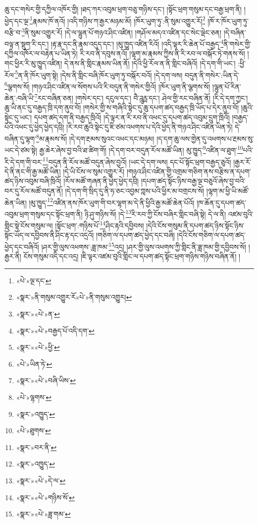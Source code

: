 ཆུ་དང་གསེར་གྱི་དཀྱིལ་འཁོར་གྱི། །ཐད་ཀར་འབུམ་ཕྲག་བཅུ་གཉིས་དང་། །སྟོང་ཕྲག་གསུམ་དང་བརྒྱ་ཕྲག་ནི། །ཕྱེད་དང་ལྔ་\footnote{«པེ་»ལྔ་དང་}རྣམས་ཁོ་ནའོ། །འདི་གཉིས་ཀ་རྒྱར་མཉམ་མོ། །ཁོར་ཡུག་ཏུ་:ནི་སུམ་འགྱུར་རོ།\footnote{«སྣར་»ནི་གསུམ་འགྱུར་རོ«པེ་»ནི་གསུམ་འགྱུར།} །ཁོ་ར་ཁོར་ཡུག་ཏུ་བརྩི་བ་\footnote{«སྣར་»«པེ་»ན་}ནི་སུམ་འགྱུར་རོ། །དེ་ལ་ལྷུན་པོ་གཉའ་ཤིང་འཛིན། །གཤོལ་མདའ་འཛིན་དང་སེང་ལྡེང་ཅན། །དེ་བཞིན་བལྟ་ན་སྡུག་རི་དང་། །རྟ་རྣ་དང་ནི་རྣམ་འདུད་དང་། །མུ་ཁྱུད་འཛིན་རིའོ། །འདི་ལྟར་རི་ཆེན་པོ་བརྒྱད་\footnote{«སྣར་»«པེ་»བརྒྱད་པོ་འདི་དག་}ནི་གསེར་གྱི་དཀྱིལ་འཁོར་ལ་བརྟེན་པ་ཡིན་ཏེ། རི་རབ་ནི་དབུས་ནའོ། །ལྷག་མ་རྣམས་ཀྱིས་ནི་རི་རབ་ལ་བསྐོར་ཏེ་གནས་སོ། །གང་ཕྱིར་རི་མུ་ཁྱུད་འཛིན། དེ་ནས་ནི་གླིང་རྣམས་ཡིན་ནོ། །དེའི་ཕྱི་རོལ་ན་ནི་གླིང་བཞིའོ། །དེ་དག་གི་ཡང་། :ཕྱི་རོལ་\footnote{«སྣར་»«པེ་»ཕྱི་}ན་ནི་ཁོར་ཡུག་སྟེ། །དེས་ནི་གླིང་བཞི་ཁོར་ཡུག་ཏུ་བསྐོར་བའོ། །དེ་དག་ལས། བདུན་ནི་གསེར་:ཡིན་དེ་\footnote{«པེ་»ཡིན་ཏེ་}ལྕགས་སོ། །གཉའ་ཤིང་འཛིན་ལ་སོགས་པའི་རི་བདུན་ནི་གསེར་གྱིའོ། །ཁོར་ཡུག་ནི་ལྕགས་སོ། །ལྷུན་པོ་རིན་ཆེན་:བཞི་ཡི་\footnote{«སྣར་»«པེ་»བཞི་ཡིས་}རང་བཞིན་ཅན། །གསེར་དང་། དངུལ་དང་། བཻ་ཌཱུཪྻ་དང་། ཤེལ་གྱི་རང་བཞིན་ནོ། །རི་དེ་དག་ཀྱང་། ཆུ་ཡི་ནང་དུ་བརྒྱད་ཁྲི་དག་ནུབ་བོ། །གསེར་གྱི་ས་གཞིའི་སྟེང་དུ་ཆུ་དཔག་ཚད་བརྒྱད་ཁྲི་ཡོད་པ་དེར་ནུབ་བོ། །ཆུའི་སྟེང་དུ་ཡང་། དཔག་ཚད་དག་ནི་བརྒྱད་ཁྲིའོ། །དེ་ལྟར་ན་རི་རབ་ནི་འཕང་དུ་དཔག་ཚད་འབུམ་དྲུག་ཁྲིའོ། །བརྒྱད་པོའི་འཕང་དུ་ཕྱེད་ཕྱེད་དབྲི། །རི་རབ་ཆུའི་སྟེང་དུ་ཇི་ཙམ་འཕགས་པ་དེའི་ཕྱེད་ནི་གཉའ་ཤིང་འཛིན་ཡིན་ཏེ། དེ་བཞིན་དུ་ལྷག་\footnote{«པེ་»ལྷགས་}མ་རྣམས་སོ། །དེ་དག་རྔམས་སུའང་འཕང་དང་མཉམ། །ད་དག་ཆུ་ལས་གྱེན་དུ་འཕགས་པ་རྔམས་སུ་ཡང་དེ་ཙམ་སྟེ། རྒྱ་ཆེར་ཞེས་བྱ་བའི་ཐ་ཚིག་གོ། །དེ་དག་བར་བདུན་རོལ་མཚོ་ཡིན། མུ་ཁྱུད་\footnote{«སྣར་»འཁྱུད་}འཛིན་ལ་ཐུག་\footnote{«པེ་»ཐུགས་}པའི་རི་དེ་དག་གི་བར་\footnote{«སྣར་»བར་ནི་}བདུན་ནི་རོལ་མཚོ་བདུན་ཞེས་བྱའོ། །ཡང་དེ་དག་ལས། དང་པོ་སྟོང་ཕྲག་བརྒྱད་ཅུའོ། །རྒྱར་རོ་དེ་ནི་ནང་གི་རྒྱ་མཚོ་ཡིན། །དེ་ཡི་ངོས་ལ་སུམ་འགྱུར་རོ། །གཉའ་ཤིང་འཛིན་གྱི་འགྲམ་གཅིག་ནས་བརྩིས་ན་དཔག་ཚད་ཉིས་འབུམ་བཞི་ཁྲིའོ། །རོལ་མཚོ་གཞན་ནི་ཕྱེད་ཕྱེད་དབྲི། །དཔག་ཚད་སྟོང་ཉིས་བརྒྱ་ལྔ་བཅུའོ་ཞེས་བྱ་བའི་བར་དུ་རོལ་མཚོ་བདུན་ནོ། །དེ་དག་གི་སྲིད་དུ་ནི་ཧ་ཅང་འབྱམ་ཀླས་པའི་ཕྱིར་མ་བགྲངས་སོ། །ལྷག་མ་ཕྱི་ཡི་མཚོ་ཆེན་ཡིན། །མུ་ཁྱུད་\footnote{«སྣར་»འཁྱུད་}འཛིན་ནས་ཁོར་ཡུག་གི་བར་ལྷག་མ་དེ་ནི་ཕྱིའི་རྒྱ་མཚོ་ཆེན་པོའོ། །ཁ་ཆོན་དུ་དཔག་ཚད་འབུམ་ཕྲག་གསུམ་དང་སྟོང་ཕྲག་ནི། ཉི་ཤུ་གཉིས་སོ། །དེ་\footnote{«སྣར་»«པེ་»དེ་ལ་}རི་རབ་ཀྱི་ངོས་བཞིར་གླིང་བཞི་སྟེ། དེ་ལ་ནི། འཛམ་བུའི་གླིང་སྟེ་ངོས་གསུམ་ལ། །སྟོང་ཕྲག་:གཉིས་པོ་\footnote{«སྣར་»«པེ་»གཉིས་སོ་}ཤིང་རྟའི་དབྱིབས། །དེའི་ངོས་གསུམ་ནི་དཔག་ཚད་ཉིས་སྟོང་ཉིས་སྟོང་ཡོད་ལ་དབྱིབས་ནི་ཤིང་རྟ་དང་འདྲའོ། །གཅིག་ལ་དཔག་ཚད་ཕྱེད་དང་བཞི། །དེའི་ངོས་གཅིག་ལ་དཔག་ཚད་ཕྱེད་དང་བཞིའོ། །ཤར་གྱི་ལུས་འཕགས་:ཟླ་ཁམ་\footnote{«སྣར་»«པེ་»ཟླ་གམ་}འདྲ། །ཤར་གྱི་ལུས་འཕགས་ཀྱི་གླིང་ནི་ཟླ་ཁམ་གྱི་དབྱིབས་སོ། །རྒྱར་ནི། ངོས་གསུམ་འདི་དང་འདྲ། །ཇི་ལྟར་འཛམ་བུའི་གླིང་ལ་དཔག་ཚད་སྟོང་ཕྲག་གཉིས་གཉིས་བཞིན་ནོ། །
